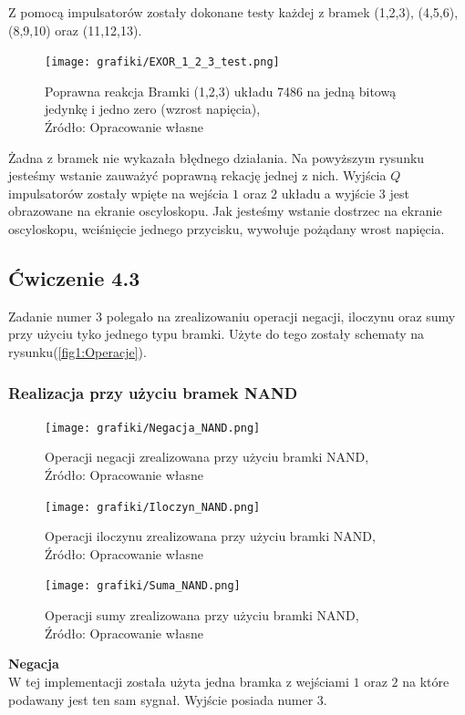 \documentclass{article}
\begin{document}
        Z pomocą impulsatorów zostały dokonane testy każdej z bramek (1,2,3), (4,5,6), (8,9,10) oraz (11,12,13).

        \begin{figure}[!ht]
          \centering
          \texttt{[image: grafiki/EXOR\_1\_2\_3\_test.png]}
          \caption{Poprawna reakcja Bramki (1,2,3) układu 7486 na jedną bitową jedynkę i jedno zero (wzrost napięcia),
          \\Źródło: Opracowanie własne}
        \end{figure}
        Żadna z bramek nie wykazała błędnego działania. Na powyższym rysunku jesteśmy wstanie zauważyć poprawną rekację jednej z nich. Wyjścia $Q$ impulsatorów zostały wpięte na wejścia $1$ oraz $2$ układu a wyjście $3$ jest obrazowane na ekranie oscyloskopu. Jak jesteśmy wstanie dostrzec na ekranie oscyloskopu, wciśnięcie jednego przycisku, wywołuje pożądany wrost napięcia.

    \subsection{Ćwiczenie 4.3}
        Zadanie numer 3 polegało na zrealizowaniu operacji negacji, iloczynu oraz sumy przy użyciu tyko jednego typu bramki. Użyte do tego zostały schematy na rysunku(\ref{fig1:Operacje}).

        \subsubsection{Realizacja przy użyciu bramek NAND}

        \begin{figure}[!ht]
          \begin{minipage}{.33\textwidth}
            \centering
            \texttt{[image: grafiki/Negacja\_NAND.png]}
            \caption{Operacji negacji zrealizowana przy użyciu bramki NAND,
            \\Źródło: Opracowanie własne}
          \end{minipage}
          \begin{minipage}{.33\textwidth}
            \centering
            \texttt{[image: grafiki/Iloczyn\_NAND.png]}
            \caption{Operacji iloczynu zrealizowana przy użyciu bramki NAND,
            \\Źródło: Opracowanie własne}
          \end{minipage}
          \begin{minipage}{.33\textwidth}
            \centering
            \texttt{[image: grafiki/Suma\_NAND.png]}
            \caption{Operacji sumy zrealizowana przy użyciu bramki NAND,
            \\Źródło: Opracowanie własne}
          \end{minipage}
        \end{figure}
        \textbf{Negacja} \\
        W tej implementacji została użyta jedna bramka z wejściami $1$ oraz $2$ na które podawany jest ten sam sygnał. Wyjście posiada numer $3$.
\end{document}

